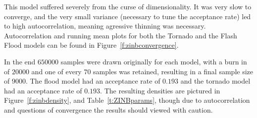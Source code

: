 \documentclass{article}\usepackage[]{graphicx}\usepackage[]{color}
\begin{document}
This model suffered severely from the curse of dimensionality. It was very slow to converge, and the very small variance (necessary to tune the acceptance rate) led to high autocorrelation, meaning agressive thinning was necessary. Autocorrelation and running mean plots for both the Tornado and the Flash Flood models can be found in Figure~\ref{f:zinbconvergence}. 


In the end $650000$ samples were drawn originally for each model, with a burn in of $20000$ and one of every $70$ samples was retained, resulting in a final sample size of $9000$. The flood model had an acceptance rate of $0.193$ and the tornado model had an acceptance rate of $0.193$. The resulting densities are pictured in Figure~\ref{f:zinbdensity}, and Table~\ref{t:ZINBparams}, though due to autocorrelation and questions of convergence the results should viewed with caution.
\end{document}
